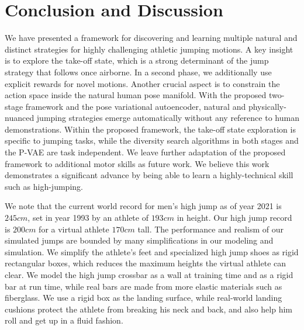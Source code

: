 \section{Conclusion and Discussion}

{We have presented a framework for discovering and learning multiple natural and distinct strategies for highly challenging athletic jumping motions. 
A key insight is to explore the take-off state, which is a strong determinant of the jump strategy that follows once airborne. In a second phase, we additionally use explicit rewards for novel motions. Another crucial aspect is to constrain the action space inside the natural human pose manifold. With the proposed two-stage framework and the pose variational autoencoder, natural and physically-nuanced jumping strategies emerge automatically without any reference to human demonstrations. Within the proposed framework, the take-off state exploration is specific to jumping tasks, while the diversity search algorithms in both stages and the P-VAE are task independent. We leave further adaptation of the proposed framework to additional motor skills as future work. We believe this work demonstrates a significant advance by being able to learn a highly-technical skill such as high-jumping.}

{We note that the current world record for men's high jump as of year 2021 is $245cm$, set in year 1993 by an athlete of $193cm$ in height. Our high jump record is $200cm$ for a virtual athlete $170cm$ tall. The performance and realism of our simulated jumps are bounded by many simplifications in our modeling and simulation.} We simplify the athlete's feet and specialized high jump shoes as rigid rectangular boxes, which reduces the maximum heights the virtual athlete can clear. We model the high jump crossbar as a wall at training time and as a rigid bar at run time, while real bars are made from more elastic materials such as fiberglass. We use a rigid box as the landing surface, while real-world landing cushions protect the athlete from breaking his neck and back, and also help him roll and get up in a fluid fashion.


